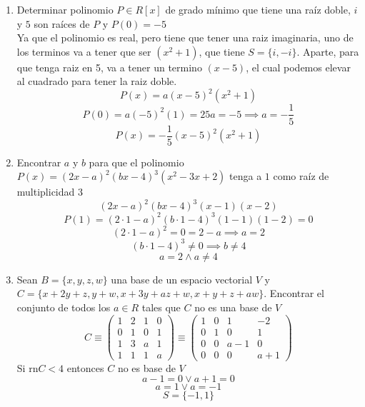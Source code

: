 \documentclass[../practica.root.tex]{subfiles}
\begin{document}
\begin{enumerate}
    \item Determinar polinomio $P \in R[x]$ de grado mínimo que tiene una raíz doble, $i$ y $5$ son raíces de $P$ y $P(0) = -5$ \\
          Ya que el polinomio es real, pero tiene que tener una raiz imaginaria, uno de los terminos va a tener que ser $(x^2 + 1)$, que tiene $S = \{i, -i\}$. Aparte, para que tenga raiz en 5, va a tener un termino $(x-5)$, el cual podemos elevar al cuadrado para tener la raiz doble.
          \[ P(x) = a(x-5)^2(x^2+1) \]
          \[ P(0) = a(-5)^2(1) = 25a = -5 \implies a = -\frac{1}{5} \]
          \[ P(x) = -\frac{1}{5}(x-5)^2(x^2+1) \]

    \item Encontrar $a$ y $b$ para que el polinomio $P(x) = (2x-a)^2(bx-4)^3(x^2-3x+2)$ tenga a $1$ como raíz de multiplicidad $3$ %
          \[ (2x - a)^2 (bx - 4)^3 (x - 1)(x - 2) \]
          \[ P(1) = (2\cdot 1 - a)^2 (b\cdot 1 - 4)^3 (1 - 1)(1 - 2) = 0 \]
          \[ (2\cdot 1 - a)^2 = 0 = 2 - a \implies a = 2 \]
          \[ (b\cdot 1 - 4)^3 \neq 0 \implies b \neq 4 \]
          \[ \boxed{a = 2 \land a \neq 4} \]

    \item Sean $B = \{x, y, z, w\}$ una base de un espacio vectorial $V$ y $C = \{x + 2y + z,y + w,x + 3y + az + w,x + y + z + aw\}$. Encontrar el conjunto de todos los $a \in R$ tales que $C$ no es una base de $V$ %
          \[
              C \equiv \begin{pmatrix}
                  1 & 2 & 1 & 0 \\
                  0 & 1 & 0 & 1 \\
                  1 & 3 & a & 1 \\
                  1 & 1 & 1 & a
              \end{pmatrix}
              \equiv
              \begin{pmatrix}
                  1 & 0 & 1   & -2  \\
                  0 & 1 & 0   & 1   \\
                  0 & 0 & a-1 & 0   \\
                  0 & 0 & 0   & a+1
              \end{pmatrix}
          \]
          Si \(\text{rn} C < 4\) entonces \(C\) no es base de \(V\)
          \[ a - 1 = 0 \lor a + 1 = 0\]
          \[ a = 1 \lor a = - 1 \]
          \[ \boxed{S = \{-1, 1\}} \]


\end{enumerate}
\end{document}

